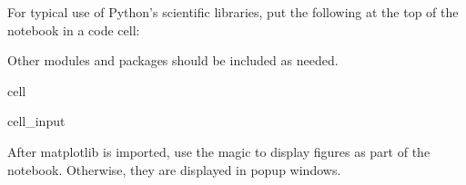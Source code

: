 \documentclass[letterpaper,10pt,english]{jupyterBook}
\begin{document}
\sphinxAtStartPar
For typical use of Python’s scientific libraries, put the following at the top of the notebook in a code cell:



\sphinxAtStartPar
Other  modules and packages should be included as needed.

\begin{sphinxuseclass}{cell}\begin{sphinxVerbatimInput}

\begin{sphinxuseclass}{cell_input}
\begin{sphinxVerbatim}[commandchars=\\\{\}]
   
   
   
   
   
   
\end{sphinxVerbatim}

\end{sphinxuseclass}\end{sphinxVerbatimInput}

\end{sphinxuseclass}
\begin{DUlineblock}{0em}
\item[] 
\end{DUlineblock}

\sphinxAtStartPar
After matplotlib is imported, use the  magic to display figures as part of the notebook. Otherwise, they are displayed in popup windows.
\end{document}

